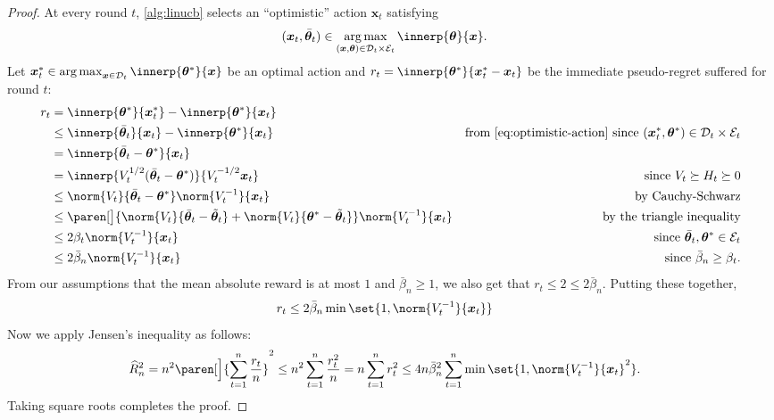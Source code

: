 \documentclass{article}
\renewcommand{\vec}[1]{\bm{#1}}
\newcommand{\inv}[1]{#1^{-1}}
\newcommand{\argmax}{\operatorname*{arg\,max}}
\DeclarePairedDelimiter{\paren}()
\newcommand{\D}{\mathcal{D}}
\newcommand{\E}{\mathcal{E}}
\begin{document}
\begin{proof}
  At every round $t$, \cref{alg:linucb} selects an ``optimistic''
  action $\vec x_t$ satisfying
  \begin{align}\label{eq:optimistic-action}
    (\vec x_t,\bar{\vec\theta}_t)
    &\in \argmax_{(\vec x, \vec\theta) \in\D_t\times\E_t} \innerp{\vec\theta}{\vec x}.
  \end{align}
  Let $\vec x_t^* \in \argmax_{\vec x\in\D_t}\innerp{\vec\theta^*}{\vec x}$ be an optimal
  action and $r_t = \innerp{\vec\theta^*}{\vec x_t^* - \vec x_t}$ be the immediate
  pseudo-regret suffered for round $t$:
  \begin{align*}
    r_t &= \innerp{\vec\theta^*}{\vec x_t^*} - \innerp{\vec\theta^*}{\vec x_t} \\
        &\le \innerp{\bar{\vec\theta}_t}{\vec x_t} - \innerp{\vec\theta^*}{\vec x_t}
        &\text{from \eqref{eq:optimistic-action} since }
          (\vec x_t^*,\vec\theta^*) \in \D_t\times\E_t \\
        &= \innerp{\bar{\vec\theta}_t - \vec\theta^*}{\vec x_t} \\
       &= \innerp{V_t^{1/2}(\bar{\vec\theta}_t - \vec\theta^*)}{V_t^{-1/2} \vec x_t}
        &\text{since } V_t \succeq H_t \succeq 0 \\
        &\le \norm{V_t}{\bar{\vec\theta}_t - \vec\theta^*}\norm{\inv{V_t}}{\vec x_t}
        &\text{by Cauchy-Schwarz}\\
        &\le \paren[\big]{\norm{V_t}{\bar{\vec\theta}_t - \tilde{\vec\theta}_t}
          + \norm{V_t}{\vec\theta^* - \tilde{\vec\theta}_t}}
          \norm{\inv{V_t}}{\vec x_t}
        &\text{by the triangle inequality}\\
        &\le 2\beta_t\norm{\inv{V_t}}{\vec x_t}
        &\text{since } \bar{\vec\theta}_t, \vec\theta^* \in \E_t \\
        &\le 2\bar\beta_n\norm{\inv{V_t}}{\vec x_t}
        &\text{since } \bar\beta_n \ge \beta_t.
  \end{align*}
  From our assumptions that the mean absolute reward is at most $1$
  and $\bar\beta_n \ge 1$, we also get that $r_t \le 2 \le 2\bar\beta_n$.
  Putting these together,
  \begin{align}\label{eq:regret-bound-oneround}
    r_t &\le 2\bar\beta_n \min\set{1, \norm{\inv{V_t}}{\vec x_t}}
  \end{align}
  Now we apply Jensen's inequality as follows:
  \begin{align*}
    \widehat R_n^2 &= n^2 \paren[\Big]{\sum_{t=1}^n \frac{r_t}{n}}^2
                   \le n^2 \sum_{t=1}^n \frac{r_t^2}{n} = n\sum_{t=1}^nr_t^2
                   \le 4n\bar\beta_n^2\sum_{t=1}^n\min\set{1,\norm{\inv{V_t}}{\vec x_t}^2}.
  \end{align*}
  Taking square roots completes the proof.
\end{proof}
\end{document}

